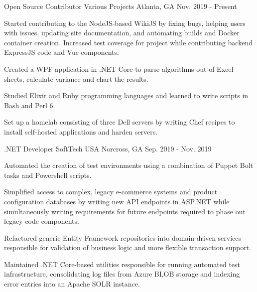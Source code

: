 

\begin{cventries}

\cventry
{Open Source Contributor} %
{Various Projects} %
{Atlanta, GA} %
{Nov. 2019 - Present} %
{
    \begin{cvitems} %
        \item {Started contributing to the NodeJS-based WikiJS by fixing bugs, helping users with issues, updating site documentation, and automating builds and Docker container creation. Increased test coverage for project while contributing backend ExpressJS code and Vue components.}
        \item {Created a WPF application in .NET Core to parse algorithms out of Excel sheets, calculate variance and chart the results. }
        \item {Studied Elixir and Ruby programming languages and learned to write scripts in Bash and Perl 6.}
        \item {Set up a homelab consisting of three Dell servers by writing Chef recipes to install self-hosted applications and harden servers.}
    \end{cvitems}
}

  \cventry
    {.NET Developer} %
    {SoftTech USA} %
    {Norcross, GA} %
    {Sep. 2019 - Nov. 2019} %
    {
      \begin{cvitems} %
        \item {Automated the creation of test environments using a combination of Puppet Bolt tasks and Powershell scripts.}
        \item {Simplified access to complex, legacy e-commerce systems and product configuration databases by writing new API endpoints in ASP.NET while simultaneously writing requirements for future endpoints required to phase out legacy code components. }
        \item {Refactored generic Entity Framework repositories into domain-driven services responsible for validation of business logic and more flexible transaction support.}
        \item {Maintained .NET Core-based utilities responsible for running automated test infrastructure, consolidating log files from Azure BLOB storage and indexing error entries into an Apache SOLR instance.}
      \end{cvitems}
    }


\end{cventries}
